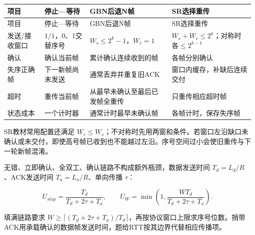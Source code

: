 \par\smallskip
\begin{wideblock}
{\fontsize{9.3}{12}\selectfont\setlength{\tabcolsep}{2.5pt}\setlength{\LTleft}{0pt}\setlength{\LTright}{0pt}
\begin{longtable}{@{}>{\raggedright\arraybackslash}p{}>{\raggedright\arraybackslash}p{}>{\raggedright\arraybackslash}p{}>{\raggedright\arraybackslash}p{}@{}}
\toprule
项目 & 停止---等待 & GBN后退N帧 & SR选择重传 \\

\midrule\endfirsthead\toprule
项目 & 停止---等待 & GBN后退N帧 & SR选择重传 \\

\midrule\endhead\bottomrule\endfoot
发送/接收窗口 & \(1/1\)，0、1交替序号 & \(W_s\le2^k-1\)，\(W_r=1\) & \(W_s+W_r\le2^k\)；对称时各\(\le2^{k-1}\) \\

确认 & 确认当前帧 & 累计确认连续收到的帧 & 各帧分别确认 \\

失序正确帧 & 下一新帧尚未发送 & 通常丢弃并重复旧ACK & 窗口内缓存，补缺后连续交付 \\

超时 & 重传当前帧 & 从最早未确认至最后已发帧全重传 & 只重传相应超时帧 \\

状态成本 & 一个计时器 & 通常计时最早未确认帧 & 各帧计时，保存失序帧 \\

\end{longtable}}
\end{wideblock}
\par\smallskip

SR教材常用配置还满足 \(W_r\le W_s\)；不对称时先用两窗和条件。若窗口左沿缺口未确认或未交付，即使高号帧已收到也不能越过左沿。序号空间过小会使旧重传与下一轮新帧混淆。

无错、立即确认、全双工、确认链路不构成额外瓶颈，数据发送时间 \(T_d=L_d/R\)、ACK发送时间 \(T_a=L_a/R\)、单向传播 \(\tau\)：

\[U_{stop}=\frac{T_d}{T_d+2\tau+T_a},\qquad U_W=\min\left(1,\frac{WT_d}{T_d+2\tau+T_a}\right).\]

填满链路要求 \(W\ge\lceil(T_d+2\tau+T_a)/T_d\rceil\)，再按协议窗口上限求序号位数。捎带ACK用承载确认的数据帧发送时间，题给RTT按其边界代替相应传播项。

